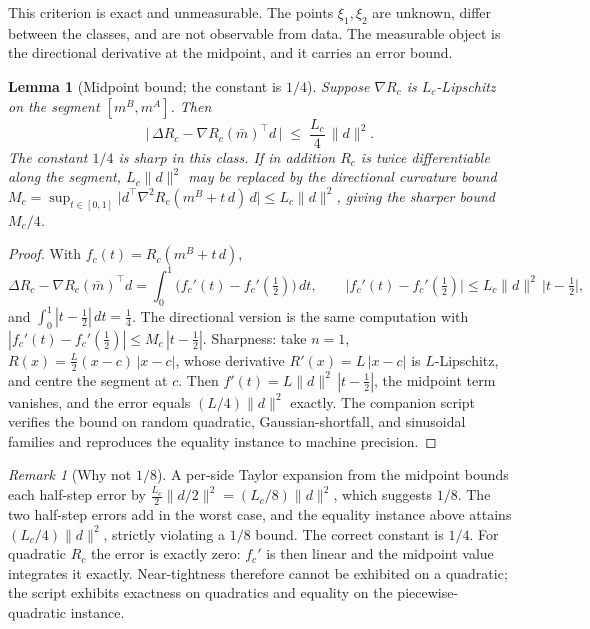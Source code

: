 \documentclass[11pt]{article}
\newtheorem{lemma}{Lemma}
\theoremstyle{definition}
\theoremstyle{remark}
\newtheorem{remark}{Remark}
\newcommand{\mbar}{\bar{m}}
\begin{document}
This criterion is exact and unmeasurable. The points $\xi_1, \xi_2$ are
unknown, differ between the classes, and are not observable from data. The
measurable object is the directional derivative at the midpoint, and it
carries an error bound.

\begin{lemma}[Midpoint bound; the constant is $1/4$]\label{lem:midpoint}
Suppose $\nabla R_c$ is $L_c$-Lipschitz on the segment $[m^B, m^A]$. Then
\begin{equation}\label{eq:midpoint}
\bigl|\,\Delta R_c - \nabla R_c(\mbar)^{\top} d\,\bigr|
\;\le\; \frac{L_c}{4}\,\|d\|^2 .
\end{equation}
The constant $1/4$ is sharp in this class. If in addition $R_c$ is twice
differentiable along the segment, $L_c\|d\|^2$ may be replaced by the
directional curvature bound
$M_c = \sup_{t\in[0,1]} \bigl|d^{\top}\nabla^2 R_c(m^B + t\,d)\,d\bigr|
\le L_c\|d\|^2$, giving the sharper bound $M_c/4$.
\end{lemma}

\begin{proof}
With $f_c(t) = R_c(m^B + t\,d)$,
\[
\Delta R_c - \nabla R_c(\mbar)^{\top} d
= \int_0^1 \bigl(f_c'(t) - f_c'(\tfrac12)\bigr)\,dt ,
\qquad
\bigl|f_c'(t) - f_c'(\tfrac12)\bigr| \le L_c\|d\|^2\,\bigl|t-\tfrac12\bigr| ,
\]
and $\int_0^1 |t - \tfrac12|\,dt = \tfrac14$. The directional version is the
same computation with $|f_c'(t)-f_c'(\tfrac12)| \le M_c\,|t-\tfrac12|$.
Sharpness: take $n=1$, $R(x) = \tfrac{L}{2}(x-c)\,|x-c|$, whose derivative
$R'(x) = L\,|x-c|$ is $L$-Lipschitz, and centre the segment at $c$. Then
$f'(t) = L\|d\|^2\,|t-\tfrac12|$, the midpoint term vanishes, and the error
equals $(L/4)\|d\|^2$ exactly. The companion script verifies the bound on
random quadratic, Gaussian-shortfall, and sinusoidal families and reproduces
the equality instance to machine precision.
\end{proof}

\begin{remark}[Why not $1/8$]\label{rem:constant}
A per-side Taylor expansion from the midpoint bounds each half-step error by
$\tfrac{L_c}{2}\|d/2\|^2 = (L_c/8)\|d\|^2$, which suggests $1/8$. The two
half-step errors add in the worst case, and the equality instance above
attains $(L_c/4)\|d\|^2$, strictly violating a $1/8$ bound. The correct
constant is $1/4$. For quadratic $R_c$ the error is exactly zero: $f_c'$ is
then linear and the midpoint value integrates it exactly. Near-tightness
therefore cannot be exhibited on a quadratic; the script exhibits exactness
on quadratics and equality on the piecewise-quadratic instance.
\end{remark}
\end{document}
